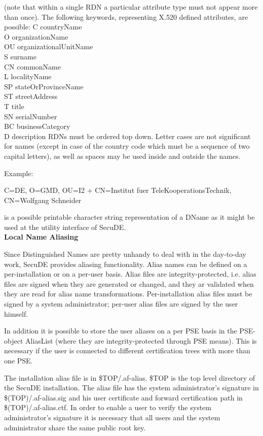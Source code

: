 (note that within a single RDN a particular attribute type must not
appear more than once).
The following keywords, representing X.520 defined attributes,  are 
possible:
{\small
\bvtab
C   \2 countryName \\
O   \2 organizationName  \\
OU  \2 organizationalUnitName \\
S   \2 surname \\
CN  \2 commonName \\
L   \2 localityName \\
SP  \2 stateOrProvinceName \\
ST  \2 streetAddress \\
T   \2 title \\
SN  \2 serialNumber \\
BC  \2 businessCategory \\
D   \2 description
\evtab
}
RDNs must be ordered top down. Letter cases are not significant for names 
(except in case of the country code which must be a sequence of two capital
 letters), as well as spaces may be used inside and outside the names.

Example: 

{\small
C=DE, O=GMD, OU=I2 $+$ CN=Institut fuer TeleKooperationsTechnik, CN=Wolfgang 
Schneider}

is a possible printable character string representation of a DName as it might
be used at the utility interface of SecuDE. 
\\ [1em]
{\bf Local Name Aliasing}

Since Distinguished Names are pretty unhandy to deal with in the
day-to-day work, SecuDE provides aliasing functionality. Alias names
can be defined on a per-installation or on a per-user basis. Alias
files are integrity-protected, i.e. alias files are signed when they are
generated or changed, and they ar validated when they are read for
alias name transformations. Per-installation alias files must be signed
by a system administrator; per-user alias files are signed by the
user himself. 

In addition it is possible to store the user aliases on a per PSE basis
in the PSE-object AliasList (where they are integrity-protected through
PSE means). This is necessary if the user is connected to different
certification trees with more than one PSE.

The installation alias file is in \$TOP/.af-alias. \$TOP
is the top level directory of the SecuDE installation. The alias file
has the system administrator's signature in \$(TOP)/.af-alias.sig and his user
certificate and forward certification path in \$(TOP)/.af-alias.ctf.
In order to enable a user to verify the system administrator's signature
it is necessary that all users and the system administrator share the
same public root key.

